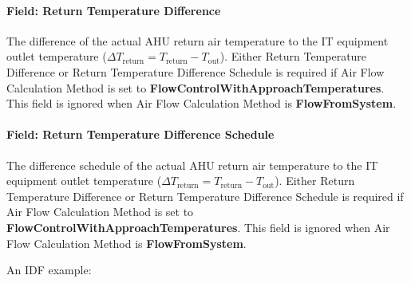 \paragraph{Field: Return Temperature Difference}\label{field-return-temperature-difference}

The difference of the actual AHU return air temperature to the IT equipment outlet temperature (${\Delta}T_{\textrm{return}} = T_{\textrm{return}}-T_{\textrm{out}}$). Either Return Temperature Difference or Return Temperature Difference Schedule is required if Air Flow Calculation Method is set to \textbf{FlowControlWithApproachTemperatures}. This field is ignored when Air Flow Calculation Method is \textbf{FlowFromSystem}.

\paragraph{Field: Return Temperature Difference Schedule}\label{field-return-temperature-difference-schedule}

The difference schedule of the actual AHU return air temperature to the IT equipment outlet temperature (${\Delta}T_{\textrm{return}} = T_{\textrm{return}}-T_{\textrm{out}}$). Either Return Temperature Difference or Return Temperature Difference Schedule is required if Air Flow Calculation Method is set to \textbf{FlowControlWithApproachTemperatures}. This field is ignored when Air Flow Calculation Method is \textbf{FlowFromSystem}.

An IDF example:

